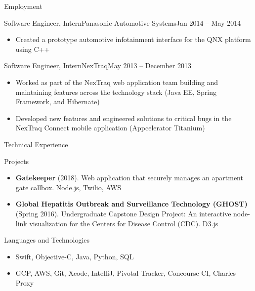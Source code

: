 \documentclass[]{mcdowellcv}
\begin{document}
\begin{cvsection}{Employment}
		\begin{cvsubsection}{Software Engineer, Intern}{Panasonic Automotive Systems}{Jan 2014 -- May 2014}
			\begin{itemize}
				\item Created a prototype automotive infotainment interface for the QNX platform using C++
			\end{itemize}
		\end{cvsubsection}

		\begin{cvsubsection}{Software Engineer, Intern}{NexTraq}{May 2013 -- December 2013}
			\begin{itemize}
				\item Worked as part of the NexTraq web application team building and maintaining features across the technology stack (Java EE, Spring Framework, and Hibernate)
				\item Developed new features and engineered solutions to critical bugs in the NexTraq Connect mobile application (Appcelerator Titanium)
			\end{itemize}
		\end{cvsubsection}
	\end{cvsection}
	
	\begin{cvsection}{Technical Experience}
		\begin{cvsubsection}{Projects}{}{}
			\begin{itemize}
				\item \textbf{Gatekeeper} (2018). Web application that securely manages an apartment gate callbox. Node.js, Twilio, AWS
				\item \textbf{Global Hepatitis Outbreak and Surveillance Technology (GHOST)} (Spring 2016). Undergraduate Capstone Design Project: An interactive node-link visualization for the Centers for Disease Control (CDC). D3.js
			\end{itemize}
		\end{cvsubsection}
	\end{cvsection}
	
	\begin{cvsection}{Languages and Technologies}
		\begin{cvsubsection}{}{}{}	
			\begin{itemize}
				\item Swift, Objective-C, Java, Python, SQL
				\item GCP, AWS, Git, Xcode, IntelliJ, Pivotal Tracker, Concourse CI, Charles Proxy
			\end{itemize}
		\end{cvsubsection}
	\end{cvsection}
	
\end{document}
